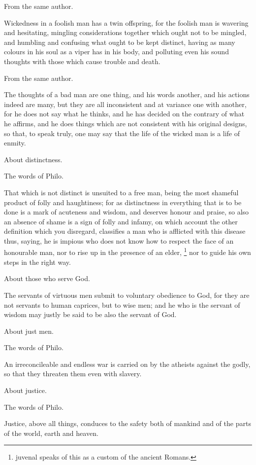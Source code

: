 From the same author.

Wickedness in a foolish man has a twin offspring, for the foolish man is wavering and hesitating,
mingling considerations together which ought not to be mingled, and humbling and confusing what
ought to be kept distinct, having as many colours in his soul as a viper has in his body, and polluting
even his sound thoughts with those which cause trouble and death.

From the same author.

The thoughts of a bad man are one thing, and his words another, and his actions indeed are many,
but they are all inconsistent and at variance one with another, for he does not say what he thinks,
and he has decided on the contrary of what he affirms, and he does things which are not
consistent with his original designs, so that, to speak truly, one may say that the life of the wicked
man is a life of enmity.

About distinctness.

The words of Philo.

That which is not distinct is unsuited to a free man, being the most shameful product of folly and
haughtiness; for as distinctness in everything that is to be done is a mark of acuteness and
wisdom, and deserves honour and praise, so also an absence of shame is a sign of folly and
infamy, on which account the other definition which you disregard, classifies a man who is afflicted
with this disease thus, saying, he is impious who does not know how to respect the face of an
honourable man, nor to rise up in the presence of an elder, \footnote{juvenal speaks of this as a custom of the
ancient Romans.} nor to guide his own steps in the right way.

About those who serve God.

The servants of virtuous men submit to voluntary obedience to God, for they are not servants to
human caprices, but to wise men; and he who is the servant of wisdom may justly be said to be
also the servant of God.

About just men.

The words of Philo.

An irreconcileable and endless war is carried on by the atheists against the godly, so that they
threaten them even with slavery.

About justice.

The words of Philo.

Justice, above all things, conduces to the safety both of mankind and of the parts of the world,
earth and heaven.

